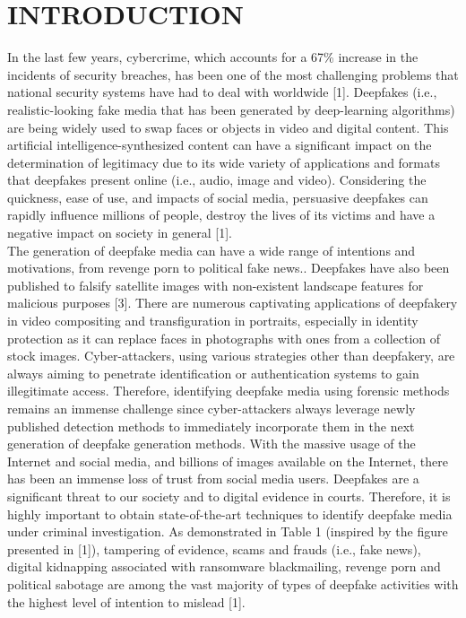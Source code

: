 

\section{INTRODUCTION}
In the last few years, cybercrime, which accounts for a 67\% increase in the incidents of security breaches, has been one of the most challenging problems that national security systems have had to deal with worldwide [1].
Deepfakes (i.e., realistic-looking fake media that has been generated by deep-learning algorithms) are being widely used to swap faces or objects in video and digital content. This artificial intelligence-synthesized
content can have a significant impact on the determination of legitimacy due to its wide variety of applications and formats that deepfakes present online (i.e., audio, image and video).
Considering the quickness, ease of use, and impacts of social media, persuasive deepfakes can rapidly influence millions of people, destroy the lives of its victims and have a negative impact on society in general [1].
\\ The generation of deepfake media can have a wide range of intentions and motivations, from revenge porn to political fake news..
Deepfakes have also been published to falsify satellite images with non-existent landscape features for malicious purposes [3].
There are numerous captivating applications of deepfakery in video compositing and transfiguration in portraits, especially in identity protection as it can replace faces in photographs with ones from a collection of stock images.
Cyber-attackers, using various strategies other than deepfakery, are always aiming to penetrate identification or authentication systems to gain illegitimate access. Therefore, identifying deepfake media using forensic methods remains
an immense challenge since cyber-attackers always leverage newly published detection methods to immediately incorporate them in the next generation of deepfake generation methods. With the massive usage of the Internet and social media,
and billions of images available on the Internet, there has been an immense loss of trust from social media users. Deepfakes are a significant threat to our society and to digital evidence in courts. Therefore, it is highly important to
obtain state-of-the-art techniques to identify deepfake media under criminal investigation.
As demonstrated in Table 1 (inspired by the figure presented in [1]), tampering of evidence, scams and frauds (i.e., fake news), digital kidnapping associated with ransomware blackmailing, revenge porn and political sabotage are among the
vast majority of types of deepfake activities with the highest level of intention to mislead [1].
